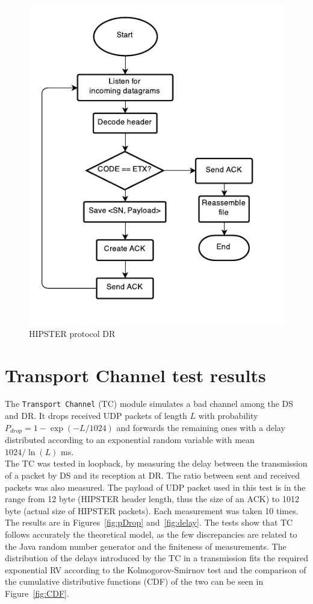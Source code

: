 \documentclass[10pt,twocolumn]{article}
\begin{document}
\begin{figure}[h]
  \centering
  \includegraphics[width=0.75\columnwidth, keepaspectratio]{Documentation/Receiver.pdf}
  \caption{HIPSTER protocol DR}
  \label{fig:receiverFlowchart}
\end{figure}

\section{Transport Channel test results}
The \texttt{Transport Channel} (TC) module simulates a bad channel among the DS and DR. It drops received UDP packets of length $L$ with probability $P_{drop} = 1 - \exp(-L/1024)$ and forwards the remaining ones with a delay distributed according to an exponential random variable with mean $1024/\ln(L)$ ms. \\
The TC was tested in loopback, by measuring the delay between the transmission of a packet by DS and its reception at DR. The ratio between sent and received packets was also measured. The payload of UDP packet used in this test is in the range from 12 byte (HIPSTER header length, thus the size of an ACK) to 1012 byte (actual size of HIPSTER packets). Each measurement was taken 10 times. The results are in Figures~\ref{fig:pDrop} and~\ref{fig:delay}. The tests show that TC follows accurately the theoretical model, as the few discrepancies are related to the Java random number generator and the finiteness of measurements. The distribution of the delays introduced by the TC in a transmission fits the required exponential RV according to the Kolmogorov-Smirnov test and the comparison of the cumulative distributive functions (CDF) of the two can be seen in Figure~\ref{fig:CDF}.
\end{document}
